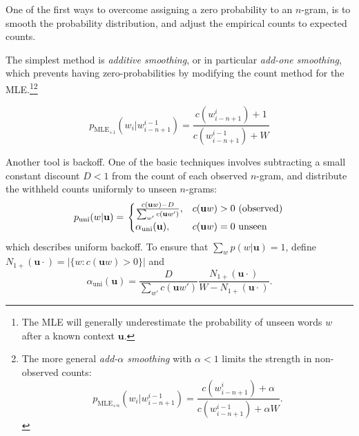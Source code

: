 One of the first ways to overcome assigning a zero probability to an $n$-gram, is to smooth the probability distribution, and adjust the empirical counts to expected counts.

The simplest method is \emph{additive smoothing}, or in particular \emph{add-one smoothing}, which prevents having zero-probabilities by modifying the count method for the MLE.\footnote{The MLE will generally underestimate the probability of unseen words $w$ after a known context $\mathbf{u}$.}\footnote{The more general \emph{add-$\alpha$ smoothing} with $\alpha < 1$ limits the strength in non-observed counts: \[ p_{\operatorname{MLE_{+\alpha}}}\left(w_i|w_{i-n+1}^{i-1}\right) = \frac{c\left(w_{i-n+1}^i\right)+\alpha}{c\left(w_{i-n+1}^{i-1}\right)+\alpha W}.\]}



\begin{equation} p_{\operatorname{MLE_{+1}}}\left(w_i|w_{i-n+1}^{i-1}\right) = \frac{c\left(w_{i-n+1}^i\right)+1}{c\left(w_{i-n+1}^{i-1}\right)+W}\label{eq:paddone}
\end{equation}


Another tool is backoff. One of the basic techniques involves subtracting a small constant discount $D < 1$ from the count of each observed $n$-gram, and distribute the withheld counts uniformly to unseen $n$-grams:
\begin{equation}
	p_{\operatorname{uni}}(w|\mathbf{u})=\left.
    \begin{cases}
    	\frac{c(\mathbf{u}w)-D}{\sum_{w'}c(\mathbf{u}w')}, & c(\mathbf{u}w) > 0\textnormal{ (observed)} \\
        \alpha_{\operatorname{uni}}(\mathbf{u}), & c(\mathbf{u}w) = 0\textnormal{ unseen}
    \end{cases}\right.
\end{equation}
which describes uniform backoff. To ensure that $\sum_wp(w|\mathbf{u})=1$, \cite{chen1996empirical} define $N_{1+}(\mathbf{u}\cdot) = |\{w:c(\mathbf{u}w) > 0\}|$ and
\begin{equation}
\alpha_{\operatorname{uni}}(\mathbf{u}) = \frac{D}{\sum_{w'}c(\mathbf{u}w')}\frac{N_{1+}(\mathbf{u}\cdot)}{W - N_{1+}(\mathbf{u}\cdot)}.
\end{equation}

